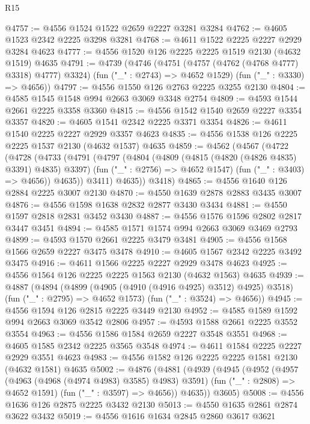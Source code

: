 \begin{lexlean}{R15}
\begin{coremodule}
@4757 := @4556 @1524 @1522 @2659 @2227 @3281 @3284
@4762 := @4605 @1523 @2342 @2225 @3298 @3281
@4768 := @4611 @1522 @2225 @2227 @2929 @3284 @4623
@4777 := @4556 @1520 @126 @2225 @2225 @1519 @2130 (@4632 @1519) @4635
@4791 := @4739
    (@4746
      (@4751 (@4757 (@4762 (@4768 @4777) @3318) @4777) @3324)
      (fun ("_" : @2743) => @4652 @1529)
      (fun ("_" : @3330) => @4656))
@4797 := @4556 @1550 @126 @2763 @2225 @3255 @2130
@4804 := @4585 @1545 @1548 @994 @2663 @3069 @3348 @2754
@4809 := @4593 @1544 @2661 @2225 @3358 @3360
@4815 := @4556 @1542 @1540 @2659 @2227 @3354 @3357
@4820 := @4605 @1541 @2342 @2225 @3371 @3354
@4826 := @4611 @1540 @2225 @2227 @2929 @3357 @4623
@4835 := @4556 @1538 @126 @2225 @2225 @1537 @2130 (@4632 @1537) @4635
@4859 := @4562
    (@4567
      (@4722
        (@4728
          (@4733
            (@4791
              (@4797
                (@4804
                  (@4809 (@4815 (@4820 (@4826 @4835) @3391) @4835) @3397)
                  (fun ("_" : @2756) => @4652 @1547)
                  (fun ("_" : @3403) => @4656))
                @4635))
            @3411)
          @4635))
      @3418)
@4865 := @4556 @1640 @126 @2884 @2225 @3007 @2130
@4870 := @4550 @1639 @2878 @2883 @3435 @3007
@4876 := @4556 @1598 @1638 @2832 @2877 @3430 @3434
@4881 := @4550 @1597 @2818 @2831 @3452 @3430
@4887 := @4556 @1576 @1596 @2802 @2817 @3447 @3451
@4894 := @4585 @1571 @1574 @994 @2663 @3069 @3469 @2793
@4899 := @4593 @1570 @2661 @2225 @3479 @3481
@4905 := @4556 @1568 @1566 @2659 @2227 @3475 @3478
@4910 := @4605 @1567 @2342 @2225 @3492 @3475
@4916 := @4611 @1566 @2225 @2227 @2929 @3478 @4623
@4925 := @4556 @1564 @126 @2225 @2225 @1563 @2130 (@4632 @1563) @4635
@4939 := @4887
    (@4894
      (@4899 (@4905 (@4910 (@4916 @4925) @3512) @4925) @3518)
      (fun ("_" : @2795) => @4652 @1573)
      (fun ("_" : @3524) => @4656))
@4945 := @4556 @1594 @126 @2815 @2225 @3449 @2130
@4952 := @4585 @1589 @1592 @994 @2663 @3069 @3542 @2806
@4957 := @4593 @1588 @2661 @2225 @3552 @3554
@4963 := @4556 @1586 @1584 @2659 @2227 @3548 @3551
@4968 := @4605 @1585 @2342 @2225 @3565 @3548
@4974 := @4611 @1584 @2225 @2227 @2929 @3551 @4623
@4983 := @4556 @1582 @126 @2225 @2225 @1581 @2130 (@4632 @1581) @4635
@5002 := @4876
    (@4881
      (@4939
        (@4945
          (@4952
            (@4957 (@4963 (@4968 (@4974 @4983) @3585) @4983) @3591)
            (fun ("_" : @2808) => @4652 @1591)
            (fun ("_" : @3597) => @4656))
          @4635))
      @3605)
@5008 := @4556 @1636 @126 @2875 @2225 @3432 @2130
@5013 := @4550 @1635 @2861 @2874 @3622 @3432
@5019 := @4556 @1616 @1634 @2845 @2860 @3617 @3621

\end{coremodule}
\end{lexlean}

